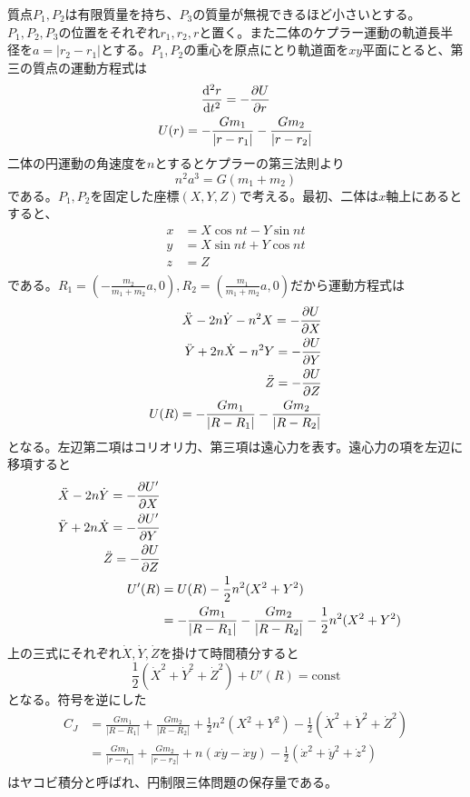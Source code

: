 	質点$P_1,P_2$は有限質量を持ち、$P_3$の質量が無視できるほど小さいとする。$P_1,P_2,P_3$の位置をそれぞれ$r_1,r_2,r$と置く。また二体のケプラー運動の軌道長半径を$a = |r_2 - r_1|$とする。$P_1,P_2$の重心を原点にとり軌道面を$xy$平面にとると、第三の質点の運動方程式は
	\begin{gather*}
		\de[^2r]{t^2} = - \pd[U]{r}\\
		U(r) = - \frac{Gm_1}{|r - r_1|} - \frac{Gm_2}{|r - r_2|}
	\end{gather*}
	二体の円運動の角速度を$n$とするとケプラーの第三法則より
		\[n^2a^3 = G(m_1 + m_2)\]
	である。$P_1,P_2$を固定した座標$(X,Y,Z)$で考える。最初、二体は$x$軸上にあるとすると、
	\begin{align*}
		x &= X\cos nt - Y\sin nt\\
		y &= X\sin nt + Y\cos nt\\
		z &= Z\\
	\end{align*}
	である。$R_1 = \left(- \frac{m_2}{m_1 + m_2}a, 0\right), R_2 = \left(\frac{m_1}{m_1 + m_2}a, 0\right)$だから運動方程式は
	\begin{align*}
        \begin{aligned}
            \ddot{X} - 2n \dot{Y} - n^2 X = - \pd[U]{X}\\
            \ddot{Y} + 2n \dot{X} - n^2 Y = - \pd[U]{Y}\\
            \ddot{Z} = - \pd[U]{Z}\\
        \end{aligned}\\
		U(R) = - \frac{Gm_1}{|R - R_1|} - \frac{Gm_2}{|R - R_2|}
	\end{align*}
	となる。左辺第二項はコリオリ力、第三項は遠心力を表す。遠心力の項を左辺に移項すると
	\begin{align}
        \begin{aligned}
            \ddot{X} - 2n \dot{Y} = - \pd[U']{X}\\
            \ddot{Y} + 2n \dot{X} = - \pd[U']{Y}\\
            \ddot{Z} = - \pd[U]{Z}\\
        \end{aligned} \label{eq:3-body}\\
		U'(R)
        &= U(R) - \frac{1}{2}n^2(X^2 + Y^2)\\
        &= - \frac{Gm_1}{|R - R_1|} - \frac{Gm_2}{|R - R_2|} - \frac{1}{2}n^2(X^2 + Y^2)
	\end{align}
	上の三式にそれぞれ$\dot{X},\dot{Y},\dot{Z}$を掛けて時間積分すると
		\[\frac{1}{2}(\dot{X}^2 + \dot{Y}^2 + \dot{Z}^2) + U'(R) = \mathrm{const}\]
	となる。符号を逆にした
	\begin{align*}
		C_J
        &= \frac{Gm_1}{|R - R_1|} + \frac{Gm_2}{|R - R_2|} + \frac{1}{2}n^2(X^2 + Y^2) - \frac{1}{2}(\dot{X}^2 + \dot{Y}^2 + \dot{Z}^2)\\
		&= \frac{Gm_1}{|r - r_1|} + \frac{Gm_2}{|r - r_2|} + n(x\dot{y} - \dot{x}y) - \frac{1}{2}(\dot{x}^2 + \dot{y}^2 + \dot{z}^2)\\
	\end{align*}
	はヤコビ積分と呼ばれ、円制限三体問題の保存量である。


